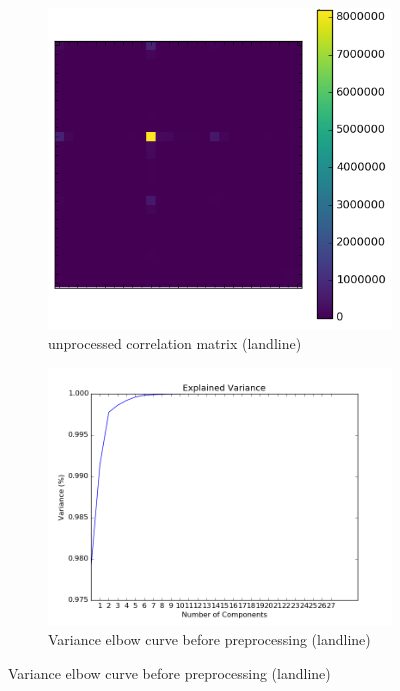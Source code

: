 \documentclass[20pt]{article} %
\begin{document}
\begin{figure}[!htbp]
  	\centering
   	\begin{subfigure}[p]{0.4\linewidth}
    	\includegraphics[width=\linewidth]{../figures/landline/raw_correlation_matrix.png}
	\caption{unprocessed correlation matrix (landline)}
   	\end{subfigure}
   	\begin{subfigure}[p]{0.4\linewidth}
    	\includegraphics[width=\linewidth]{../figures/landline/raw_variance_curve.png}
	\caption{Variance elbow curve before preprocessing (landline)}
   	\end{subfigure}
\end{figure} 
\end{document}
